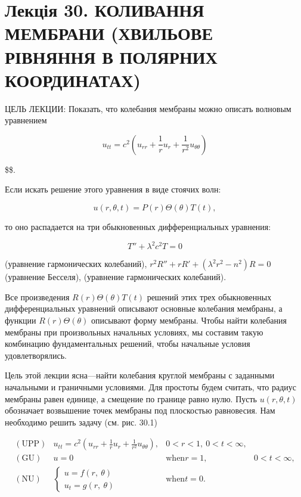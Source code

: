 \documentclass[
  ukrainian,
]{article}
\begin{document}
\section{Лекція 30. КОЛИВАННЯ МЕМБРАНИ (ХВИЛЬОВЕ РІВНЯННЯ В ПОЛЯРНИХ
КООРДИНАТАХ)}\label{ux43bux435ux43aux446ux456ux44f-30.-ux43aux43eux43bux438ux432ux430ux43dux43dux44f-ux43cux435ux43cux431ux440ux430ux43dux438-ux445ux432ux438ux43bux44cux43eux432ux435-ux440ux456ux432ux43dux44fux43dux43dux44f-ux432-ux43fux43eux43bux44fux440ux43dux438ux445-ux43aux43eux43eux440ux434ux438ux43dux430ux442ux430ux445}

ЦЕЛЬ ЛЕКЦИИ: Показать, что колебания мембраны можно описать волновым
уравнением

\[
u_{tt} = c^2 \left( u_{rr} + \frac{1}{r} u_r + \frac{1}{r^2} u_{\theta\theta} \right)
\]

\$\$.

Если искать решение этого уравнения в виде стоячих волн:

\[
u(r, \theta, t) = P(r) \Theta(\theta) T(t),
\]

то оно распадается на три обыкновенных дифференциальных уравнения:

\[
T'' + \lambda^2 c^2 T = 0
\]

(уравнение гармонических колебаний),
\(r^2 R'' + rR' + (\lambda^2 r^2 - n^2) R = 0\) (уравнение Бесселя),
(уравнение гармонических колебаний).

Все произведения \(R(r) \Theta(\theta) T(t)\) решений этих трех
обыкновенных дифференциальных уравнений описывают основные колебания
мембраны, а функции \(R(r) \Theta(\theta)\) описывают форму мембраны.
Чтобы найти колебания мембраны при произвольных начальных условиях, мы
составим такую комбинацию фундаментальных решений, чтобы начальные
условия удовлетворялись.

Цель этой лекции ясна---найти колебания круглой мембраны с заданными
начальными и граничными условиями. Для простоты будем считать, что
радиус мембраны равен единице, а смещение по границе равно нулю. Пусть
\(u\left(r,\theta,t\right)\) обозначает возвышение точек мембраны под
плоскостью равновесия. Нам необходимо решить задачу (см. рис. 30.1)

\[
\begin{array}{lll} (\text{UPP}) & u_{tt} = c^2 \left( u_{rr} + \frac{1}{r} u_r + \frac{1}{r^2} u_{\theta\theta} \right), & 0 < r < 1, \ 0 <t < \infty, \\ (\text{GU}) & u = 0 & \text{when} r = 1, & 0 < t < \infty, \\ (\text{NU}) & \begin{cases} u = f(r, \ \theta) \\ u_t = g(r, \ \theta) \end{cases} & \text{when} t = 0. \end{array}
\]
\end{document}
